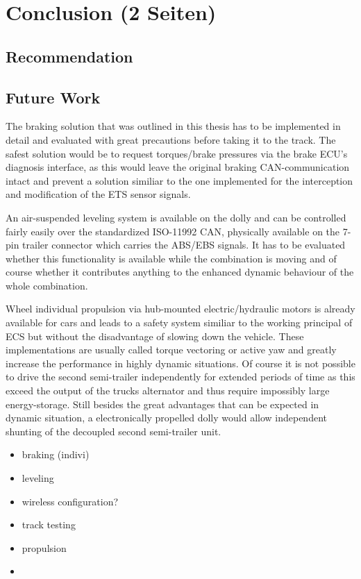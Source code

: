 \documentclass[ExampleMasters.tex]{subfiles}
\begin{document}
\clearpage
\chapter{Conclusion (2 Seiten)}
\label{chap:conclusion}

\section{Recommendation}
\label{sec:recommendation}



\section{Future Work}
\label{sec:future_work}

The braking solution that was outlined in this thesis has to be implemented in detail and evaluated with great  precautions before taking it to the track. The safest solution would be to request torques/brake pressures via the brake ECU's diagnosis interface, as this would leave the original braking CAN-communication intact and prevent a solution similiar to the one implemented for the interception and modification of the ETS sensor signals. 

An air-suspended leveling system is available on the dolly and can be controlled fairly easily over the standardized ISO-11992 CAN, physically available on the 7-pin trailer connector which carries the ABS/EBS signals. It has to be evaluated whether this functionality is available while the combination is moving and of course whether it contributes anything to the enhanced dynamic behaviour of the whole combination.

Wheel individual propulsion via hub-mounted electric/hydraulic motors is already available for cars and leads to a safety system similiar to the working principal of ECS but without the disadvantage of slowing down the vehicle. These implementations are usually called torque vectoring or active yaw and greatly increase the performance in highly dynamic situations. Of course it is not possible to drive the second semi-trailer independently for extended periods of time as this exceed the output of the trucks alternator and thus require impossibly large energy-storage. Still besides the great advantages that can be expected in dynamic situation, a electronically propelled dolly would allow independent shunting of the decoupled second semi-trailer unit.



\begin{itemize}
	\item braking (indivi)
	\item leveling
	\item wireless configuration?
	\item track testing
	\item propulsion
	\item 
\end{itemize}
\end{document}
